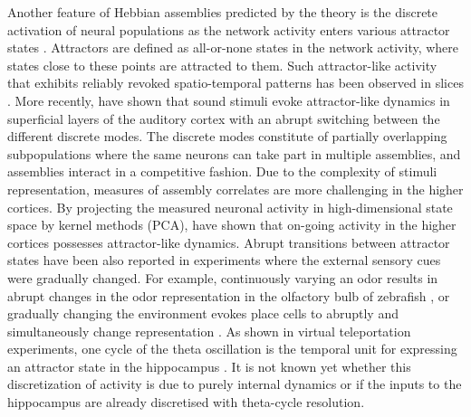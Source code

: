     Another feature of Hebbian assemblies predicted by the theory is the
    discrete activation of neural populations as the network activity enters
    various attractor states \citep{Hopfield1982}. Attractors are defined as
    all-or-none states in the network activity, where states close to these
    points are attracted to them. Such attractor-like activity that exhibits
    reliably revoked spatio-temporal patterns has been observed in slices
    \cite[e.g.,][]{Cossart2003, MacLean2005}. More recently,
    \cite{Bathellier2012} have shown that sound stimuli evoke
    attractor-like dynamics in superficial layers of the auditory cortex with
    an abrupt switching between the different discrete modes. The discrete
    modes constitute of partially overlapping subpopulations where the same
    neurons can take part in multiple assemblies, and assemblies interact in a
    competitive fashion. Due to the complexity of stimuli representation,
    measures of assembly correlates are more challenging in the higher cortices. By projecting the
    measured neuronal activity in high-dimensional state space by kernel
    methods (PCA), \cite{Balaguer2011} have shown that on-going activity in the
    higher cortices possesses attractor-like dynamics. Abrupt transitions between
    attractor states have been also reported in experiments where the external
    sensory cues were gradually changed. For example, continuously varying an
    odor results in abrupt changes in the odor representation in the olfactory
    bulb of zebrafish \citep{Niessing2010}, or gradually changing the
    environment evokes place cells to abruptly and simultaneously change
    representation \citep{Wills2005}. As shown in virtual teleportation
    experiments, one cycle of the theta oscillation is the temporal unit for
    expressing an attractor state in the hippocampus \citep{Jezek2011}. It is
    not known yet whether this discretization of activity is due to purely
    internal dynamics or if the inputs to the hippocampus are already discretised
    with theta-cycle resolution. 



